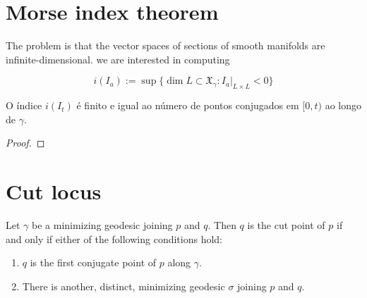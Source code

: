\section{Morse index theorem}
\label{section-morse-index}

\begin{slogan}
The problem is that the vector spaces of sections of smooth manifolds are infinite-dimensional. we are interested in computing
\end{slogan}

\begin{definition}
\label{definition-index-index-form}
$$
i(I_a):=\operatorname{sup}\{\dim L \subset \mathfrak{X}_\gamma:I_a |_{L \times L}<0\}
$$

\end{definition}

\begin{theorem}
\label{theorem-morse-index}
O índice $i(I_t)$ é finito e igual ao número de pontos conjugados em $[0,t)$ ao
longo de $\gamma$.
\end{theorem}

\begin{proof}
\end{proof}

\section{Cut locus}
\label{section-cut-locus}

\begin{proposition}
\label{proposition-first-cut-point}
Let $\gamma$ be a minimizing geodesic joining $p$ and $q$. Then $q$ is the cut
point of $p$ if and only if either of the following conditions hold:
\begin{enumerate}
\item $q$ is the first conjugate point of $p$ along $\gamma$.
\item There is another, distinct, minimizing geodesic $\sigma$ joining $p$ and
 $q$.
\end{enumerate}
\end{proposition}

